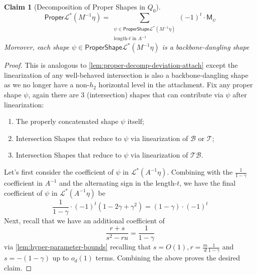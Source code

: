 \documentclass[12pt]{article}
\newtheorem{claim}[theorem]{Claim}
\newcommand{\gam}{\gamma}
\newcommand{\cm}{\mathsf{M} }
\begin{document}
\begin{claim}[Decomposition of Proper Shapes in $Q_0$]\label{clm:proper-q0-decomp}
	\[ 
	\mathsf{Proper} \mathcal{L}^*(M^{-1}\eta ) = \sum_{\substack{\psi\in \mathsf{ProperShape} \mathcal{L}^*(M^{-1}\eta )  \\ \text{length-$t$ in }A^{-1}} } (-1)^t \cdot \cm_\psi 
	\]
	Moreover, each shape $\psi\in \mathsf{ProperShape} \mathcal{L}^*(M^{-1}\eta )$ is a backbone-dangling shape
\end{claim}  
\begin{proof}
	This is analogous to \cref{lem:proper-decomp-deviation-attach} except the linearization of any well-behaved intersection is also a backbone-dangling shape as we no longer have a non-$h_2$ horizontal level in the attachment. Fix any proper shape $\psi$, again there are $3$ (intersection) shapes that can contribute via $\psi$ after linearization:
	\begin{enumerate}
		\item The properly concatenated shape $\psi$ itself;
		\item Intersection Shapes that reduce to $\psi$ via linearization of $\mathcal{B}$ or $\mathcal{T}$;
		\item Intersection Shapes that reduce to $\psi$ via linearization of $\mathcal{TB}$.
	\end{enumerate}
	Let's first consider the coefficient of $\psi$ in $\mathcal{L}^*(A^{-1}\eta )$.
	Combining with the $\frac{1}{1-\gamma}$ coefficient in $A^{-1}$ and the alternating sign in the length-$t$, we have the final coefficient of $\psi$ in $ \mathcal{L}^*(A^{-1}\eta )$ be \[ 
	\frac{1}{1-\gamma} \cdot (-1)^t (1 - 2\gam + \gam^2) = (1-\gam)\cdot  (-1)^t
	\]
	Next, recall that we have an additional coefficient of \[ 
	\frac{r+s}{s^2 -ru } = \frac{1}{1-\gamma}
	\]
	via \cref{lem:hyper-parameter-bounds} recalling that $s=O(1), r= \frac{m}{d}\frac{1}{1-\gamma}$ and $s = -(1-\gamma)$ up to $o_d(1)$ terms. Combining the above proves the desired claim.
		\end{proof} 
		
\end{document}
